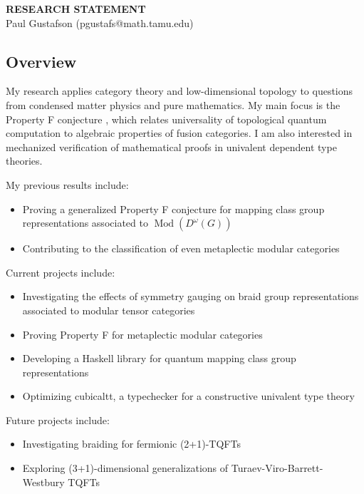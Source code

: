 \documentclass[12pt]{article}
\DeclareMathOperator{\Mod}{Mod}
\theoremstyle{plain} \numberwithin{equation}{section}
\theoremstyle{definition}
\begin{document}
\begin{center}
{\bf RESEARCH STATEMENT}\\
\vspace*{0.1cm}
{\normalsize Paul Gustafson (pgustafs@math.tamu.edu)}
\end{center}




\subsection*{Overview}

My research applies category theory and low-dimensional topology to questions from condensed matter physics and pure mathematics.   My main focus is the Property F conjecture \cite{nr}, which relates universality of topological quantum computation to algebraic properties of fusion categories. I am also interested in mechanized verification of mathematical proofs in univalent dependent type theories.

My previous results include: %
\begin{itemize}
\item Proving a generalized Property F conjecture for mapping class group representations associated to $\Mod(D^\omega(G))$ \cite{g}
\item Contributing to the classification of even metaplectic modular categories \cite{bgpr}
\end{itemize}
  
Current projects include:    %
\begin{itemize}
\item Investigating the effects of symmetry gauging on braid group representations associated to modular tensor categories
\item Proving Property F for metaplectic modular categories
\item Developing a Haskell library for quantum mapping class group representations
\item Optimizing cubicaltt, a typechecker for a constructive univalent type theory
\end{itemize}

Future projects include:
\begin{itemize}
  \item Investigating braiding for fermionic (2+1)-TQFTs \cite{walker}
  \item Exploring (3+1)-dimensional generalizations of Turaev-Viro-Barrett-Westbury TQFTs \cite{cui}
\end{itemize}
\end{document}
